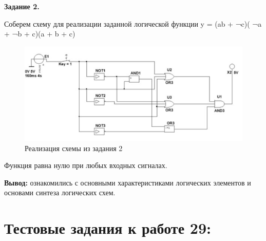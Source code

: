 \documentclass[spec, och, labwork]{shiza}
\begin{document}
\textbf{Задание 2.}

Соберем схему для реализации заданной логической функции y = (ab + ¬c)( ¬a + ¬b + c)(a + b + c)

    \begin{figure}[H]
        \centering      %
        \includegraphics[width=1.\textwidth]{3}
        \caption{Реализация схемы из задания 2}
        \label{fig:image1}
    \end{figure}

Функция равна нулю при любых входных сигналах.

\textbf{Вывод:} ознакомились с основными характеристиками логических элементов и основами синтеза логических схем.\\

\section{Тестовые задания к работе 29:}
\end{document}
